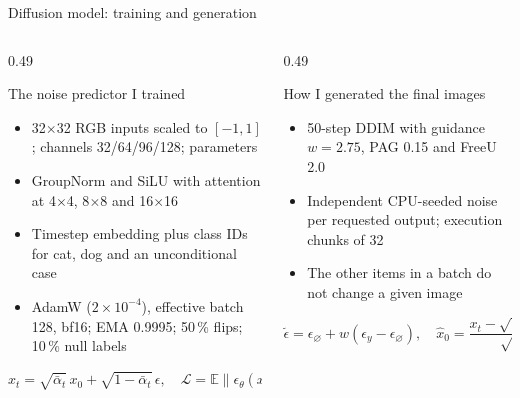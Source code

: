 \documentclass[aspectratio=169,10pt,t]{beamer}
\begin{document}
\begin{frame}{Diffusion model: training and generation}
\begin{columns}[T]
\begin{column}{0.49\linewidth}
\begin{block}{The noise predictor I trained}
\small\begin{itemize}\setlength{\itemsep}{1pt}
\item 32$\times$32 RGB inputs scaled to $[-1,1]$; channels 32/64/96/128; \params{} parameters
\item GroupNorm and SiLU with attention at 4$\times$4, 8$\times$8 and 16$\times$16
\item Timestep embedding plus class IDs for cat, dog and an unconditional case
\item AdamW ($2{\times}10^{-4}$), effective batch 128, bf16; EMA 0.9995; 50\,\% flips; 10\,\% null labels
\end{itemize}
\[
x_t=\sqrt{\bar\alpha_t}\,x_0+\sqrt{1-\bar\alpha_t}\,\epsilon,\quad
\mathcal L=\mathbb E\|\epsilon_\theta(x_t,t,\tilde y)-\epsilon\|_2^2
\]
\end{block}
\end{column}
\begin{column}{0.49\linewidth}
\begin{block}{How I generated the final images}
\small\begin{itemize}\setlength{\itemsep}{1pt}
\item 50-step DDIM with guidance $w=2.75$, PAG 0.15 and FreeU 2.0
\item Independent CPU-seeded noise per requested output; execution chunks of 32
\item The other items in a batch do not change a given image
\end{itemize}
\[
\tilde\epsilon=\epsilon_\varnothing+w(\epsilon_y-\epsilon_\varnothing),\quad
\hat x_0=\frac{x_t-\sqrt{1-\bar\alpha_t}\,\tilde\epsilon}{\sqrt{\bar\alpha_t}}
\]
\end{block}
\end{column}
\end{columns}
\end{frame}
\end{document}
